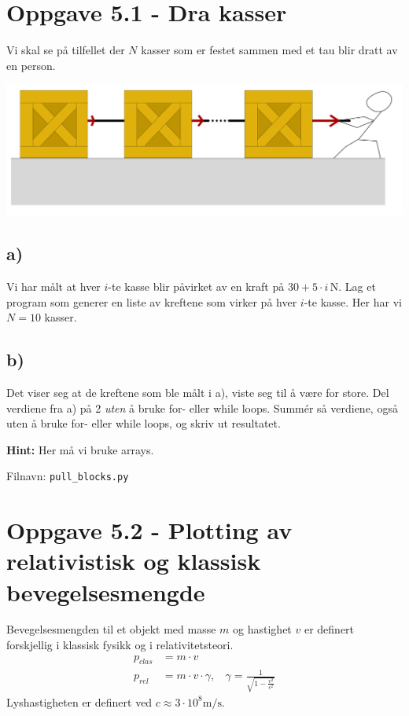 \documentclass[10pt,a4paper]{article}
\begin{document}
\section*{Oppgave 5.1 - Dra kasser}
Vi skal se på tilfellet der $N$ kasser som er festet sammen med et tau blir dratt av en person.
\begin{center}
	\includegraphics[scale=1]{fig_pull_crates-cp1.png}\\
\end{center}

\subsection*{a)}
Vi har målt at hver $i$-te kasse blir påvirket av en kraft på $30 + 5\cdot i\,\si{\newton}$.
Lag et program som generer en liste av kreftene som virker på hver $i$-te kasse. Her har vi $N = 10$ kasser.

\subsection*{b)}
Det viser seg at de kreftene som ble målt i a), viste seg til å være for store. Del verdiene fra a) på 2 \textit{uten} å bruke for- eller while loops.
Summér så verdiene, også uten å bruke for- eller while loops, og skriv ut resultatet.

\textbf{Hint:} Her må vi bruke arrays.

Filnavn: \texttt{pull\_blocks.py}

\section*{Oppgave 5.2 - Plotting av relativistisk og klassisk bevegelsesmengde}
Bevegelsesmengden til et objekt med masse $m$ og hastighet $v$ er definert forskjellig i klassisk fysikk og i relativitetsteori.
\begin{align*}
p_{clas} &= m\cdot v
\\
p_{rel} &= m\cdot v\cdot \gamma, \ \ \ \ \gamma = \frac{1}{\sqrt{1-\frac{v^2}{c^2}}}
\end{align*}
Lyshastigheten er definert ved $c \approx 3\cdot 10^8\mathrm{m/s}$.
\end{document}
